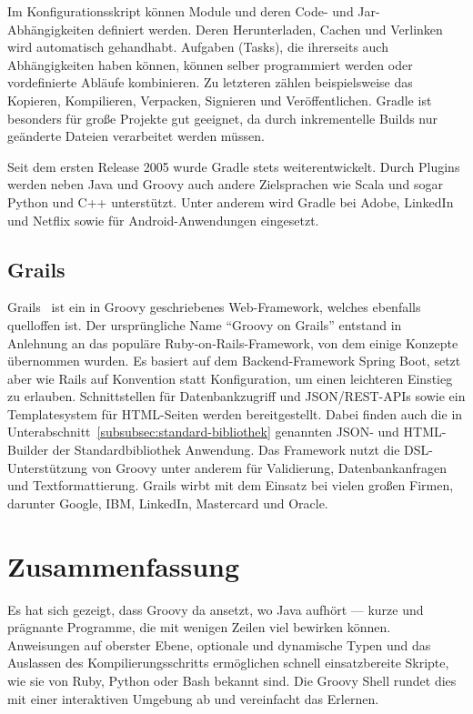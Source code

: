 \documentclass[a4paper]{article}
\begin{document}
Im Konfigurationsskript können Module und deren Code- und Jar-Abhängigkeiten definiert werden.
Deren Herunterladen, Cachen und Verlinken wird automatisch gehandhabt.
Aufgaben (Tasks), die ihrerseits auch Abhängigkeiten haben können, können selber programmiert werden oder vordefinierte Abläufe kombinieren.
Zu letzteren zählen beispielsweise das Kopieren, Kompilieren, Verpacken, Signieren und Veröffentlichen.
Gradle ist besonders für große Projekte gut geeignet, da durch inkrementelle Builds nur geänderte Dateien verarbeitet werden müssen.

Seit dem ersten Release 2005 wurde Gradle stets weiterentwickelt.
Durch Plugins werden neben Java und Groovy auch andere Zielsprachen wie Scala und sogar Python und C++ unterstützt.
Unter anderem wird Gradle bei Adobe, LinkedIn und Netflix sowie für Android-Anwendungen eingesetzt.

\subsection{Grails}\label{subsec:grails}

Grails~\cite{grails} ist ein in Groovy geschriebenes Web-Framework, welches ebenfalls quelloffen ist.
Der ursprüngliche Name ``Groovy on Grails'' entstand in Anlehnung an das populäre Ruby-on-Rails-Framework, von dem einige Konzepte übernommen wurden.
Es basiert auf dem Backend-Framework Spring Boot, setzt aber wie Rails auf Konvention statt Konfiguration, um einen leichteren Einstieg zu erlauben.
Schnittstellen für Datenbankzugriff und JSON/REST-APIs sowie ein Templatesystem für HTML-Seiten werden bereitgestellt.
Dabei finden auch die in Unterabschnitt~\ref{subsubsec:standard-bibliothek} genannten JSON- und HTML-Builder der Standardbibliothek Anwendung.
Das Framework nutzt die DSL-Unterstützung von Groovy unter anderem für Validierung, Datenbankanfragen und Textformattierung.
Grails wirbt mit dem Einsatz bei vielen großen Firmen, darunter Google, IBM, LinkedIn, Mastercard und Oracle.


\section{Zusammenfassung}\label{sec:zusammenfassung}

Es hat sich gezeigt, dass Groovy da ansetzt, wo Java aufhört --- kurze und prägnante Programme, die mit wenigen Zeilen viel bewirken können.
Anweisungen auf oberster Ebene, optionale und dynamische Typen und das Auslassen des Kompilierungsschritts ermöglichen schnell einsatzbereite Skripte, wie sie von Ruby, Python oder Bash bekannt sind.
Die Groovy Shell rundet dies mit einer interaktiven Umgebung ab und vereinfacht das Erlernen.
\end{document}
